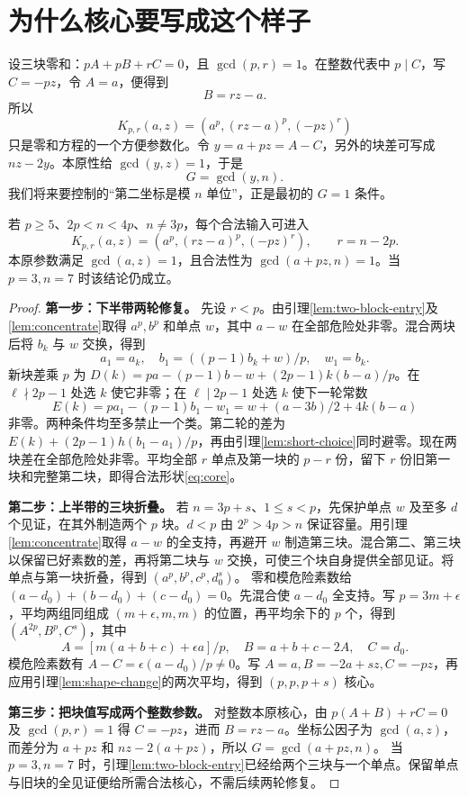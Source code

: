 \section{为什么核心要写成这个样子}
设三块零和：$pA+pB+rC=0$，且 $\gcd(p,r)=1$。在整数代表中 $p\mid C$，写 $C=-pz$，令 $A=a$，便得到
\[B=rz-a.
\]
所以
\[K_{p,r}(a,z)=(a^p,(rz-a)^p,(-pz)^r)
\]
只是零和方程的一个方便参数化。令 $y=a+pz=A-C$，另外的块差可写成 $nz-2y$。本原性给 $\gcd(y,z)=1$，于是
\[G=\gcd(y,n).
\]
我们将来要控制的“第二坐标是模 $n$ 单位”，正是最初的 $G=1$ 条件。
\begin{proposition}[一般输入的三块归约]\label{prop:entry}
若 $p\ge5$、$2p<n<4p$、$n\ne3p$，每个合法输入可进入
\begin{equation}\label{eq:core}
K_{p,r}(a,z)=(a^p,(rz-a)^p,(-pz)^r),\qquad r=n-2p.
\end{equation}
本原参数满足 $\gcd(a,z)=1$，且合法性为 $\gcd(a+pz,n)=1$。当 $p=3,n=7$ 时该结论仍成立。
\end{proposition}
\begin{proof}
\par\noindent\textbf{第一步：下半带两轮修复。} 先设 $r<p$。由引理\ref{lem:two-block-entry}及\ref{lem:concentrate}取得 $a^p,b^p$ 和单点 $w$，其中 $a-w$ 在全部危险处非零。混合两块后将 $b_k$ 与 $w$ 交换，得到
\[
a_1=a_k,\quad b_1=((p-1)b_k+w)/p,\quad w_1=b_k.
\]
新块差乘 $p$ 为 $D(k)=pa-(p-1)b-w+(2p-1)k(b-a)/p$。在 $\ell\nmid2p-1$ 处选 $k$ 使它非零；在 $\ell\mid2p-1$ 处选 $k$ 使下一轮常数
\[E(k)=pa_1-(p-1)b_1-w_1=w+(a-3b)/2+4k(b-a)
\]
非零。两种条件均至多禁止一个类。第二轮的差为 $E(k)+(2p-1)h(b_1-a_1)/p$，再由引理\ref{lem:short-choice}同时避零。现在两块差在全部危险处非零。平均全部 $r$ 单点及第一块的 $p-r$ 份，留下 $r$ 份旧第一块和完整第二块，即得合法形状\eqref{eq:core}。

\par\noindent\textbf{第二步：上半带的三块折叠。}
若 $n=3p+s$、$1\le s<p$，先保护单点 $w$ 及至多 $d$ 个见证，在其外制造两个 $p$ 块。$d<p$ 由 $2^p>4p>n$ 保证容量。用引理\ref{lem:concentrate}取得 $a-w$ 的全支持，再避开 $w$ 制造第三块。混合第二、第三块以保留已好素数的差，再将第二块与 $w$ 交换，可使三个块自身提供全部见证。将单点与第一块折叠，得到 $(a^p,b^p,c^p,d_0^s)$。
零和模危险素数给 $(a-d_0)+(b-d_0)+(c-d_0)=0$。先混合使 $a-d_0$ 全支持。写 $p=3m+\epsilon$，平均两组同组成 $(m+\epsilon,m,m)$ 的位置，再平均余下的 $p$ 个，得到 $(A^{2p},B^p,C^s)$，其中
\[
A=[m(a+b+c)+\epsilon a]/p,\quad B=a+b+c-2A,\quad C=d_0.
\]
模危险素数有 $A-C=\epsilon(a-d_0)/p\ne0$。写 $A=a,B=-2a+sz,C=-pz$，再应用引理\ref{lem:shape-change}的两次平均，得到 $(p,p,p+s)$ 核心。
\par\noindent\textbf{第三步：把块值写成两个整数参数。}
对整数本原核心，由 $p(A+B)+rC=0$ 及 $\gcd(p,r)=1$ 得 $C=-pz$，进而 $B=rz-a$。坐标公因子为 $\gcd(a,z)$，而差分为 $a+pz$ 和 $nz-2(a+pz)$，所以 $G=\gcd(a+pz,n)$。
当 $p=3,n=7$ 时，引理\ref{lem:two-block-entry}已经给两个三块与一个单点。保留单点与旧块的全见证便给所需合法核心，不需后续两轮修复。
\end{proof}

